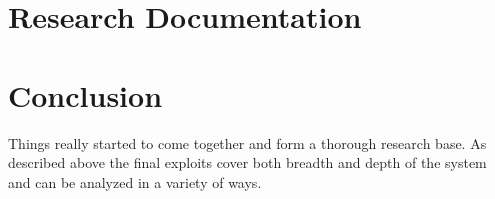 \documentclass[IEEEtran,letterpaper,10pt,notitlepage,draftclsnofoot,onecolumn]{article}
\begin{document}
\section{Research Documentation}

\section{Conclusion}
Things really started to come together and form a thorough research base.
As described above the final exploits cover both breadth and depth of the system and can be analyzed in a variety of ways.




\end{document}
